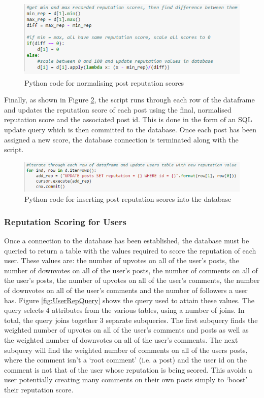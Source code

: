 \begin{figure}[H]
\centering
\includegraphics[height=1.5in]{Images/Implementation/PostRepPython2}
\caption{Python code for normalising post reputation scores}
\label{fig:PostRepPython2}
\end{figure}

Finally, as shown in Figure \ref{fig:PostRepPython3}, the script runs through each row of the dataframe and updates the reputation score of each post using the final, normalised reputation score and the associated post id. This is done in the form of an SQL update query which is then committed to the database. Once each post has been assigned a new score, the database connection is terminated along with the script.

\begin{figure}[H]
\centering
\includegraphics[width=6in]{Images/Implementation/PostRepPython3}
\caption{Python code for inserting post reputation scores into the database}
\label{fig:PostRepPython3}
\end{figure}

\subsubsection{Reputation Scoring for Users}
Once a connection to the database has been established, the database must be queried to return a table with the values required to score the reputation of each user. These values are: the number of upvotes on all of the user's posts, the number of downvotes on all of the user's posts, the number of comments on all of the user's posts, the number of upvotes on all of the user's comments, the number of downvotes on all of the user's comments and the number of followers a user has. Figure \ref{fig:UserRepQuery} shows the query used to attain these values. The query selects 4 attributes from the various tables, using a number of joins. In total, the query joins together 3 separate subqueries. The first subquery finds the weighted number of upvotes on all of the user's comments and posts as well as the weighted number of downvotes on all of the user's comments. The next subquery will find the weighted number of comments on all of the users posts, where the comment isn't a `root comment' (i.e. a post) and the user id on the comment is not that of the user whose reputation is being scored. This avoids a user potentially creating many comments on their own posts simply to `boost' their reputation score.

